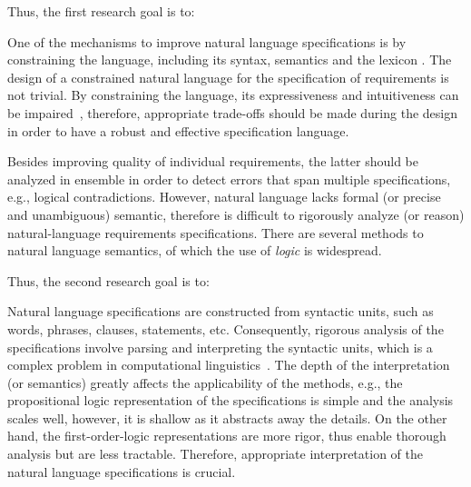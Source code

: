 Thus, the first research goal is to:
\setcounter{rgcounter}{1}
\begin{researchgoal}
\end{researchgoal}

One of the mechanisms to improve natural language specifications is by constraining the language, including its syntax, semantics and the lexicon \cite{Kuhn2014ALanguages}. The design of a constrained natural language for the specification of requirements is not trivial. By constraining the language, its expressiveness and intuitiveness can be impaired~\cite{ieereqspecstandard}\cite{Myachykov2013SyntacticRussian}, therefore, appropriate trade-offs should be made during the design in order to have a robust and effective specification language.

Besides improving quality of individual requirements, the latter should be analyzed in ensemble in order to detect errors that span multiple specifications, e.g., logical contradictions. However, natural language lacks formal (or precise and unambiguous) semantic, therefore is difficult to rigorously analyze (or reason) natural-language requirements specifications. There are several methods to natural language semantics, of which the use of \textit{logic} is widespread.

Thus, the second research goal is to:
\begin{researchgoal}
\end{researchgoal}

Natural language specifications are constructed from syntactic units, such as words, phrases, clauses, statements, etc. Consequently, rigorous analysis of the specifications involve parsing and interpreting the syntactic units, which is a complex problem in computational linguistics~\cite{Clark2010TheProcessing}. The depth of the interpretation (or semantics) greatly affects the applicability of the methods, e.g., the propositional logic representation of the specifications is simple and the analysis scales well, however, it is shallow as it abstracts away the details. On the other hand, the first-order-logic representations are more rigor, thus enable thorough analysis but are less tractable. Therefore, appropriate interpretation of the natural language specifications is crucial.

